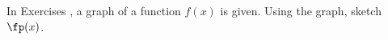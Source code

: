 {\noindent In Exercises}
{, a graph of a function $f(x)$ is given. Using the graph, sketch $\fp(x)$.
}
